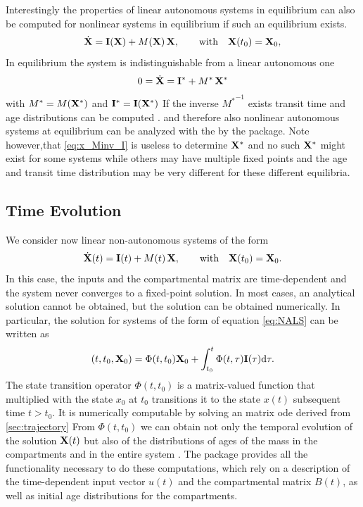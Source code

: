 Interestingly the properties of linear autonomous systems in equilibrium can
also be computed for nonlinear systems in equilibrium if such an equilibrium
exists.
\begin{equation} \label{eq:NLS}
\dot{\mathbf{X}} = \mathbf{I}(\mathbf{X}) + M(\mathbf{X}) \, \mathbf{X}, \qquad  \mathrm{with} \quad \mathbf{X}(t_0) = \mathbf{X}_0,
\end{equation}
In equilibrium the system is indistinguishable from a linear autonomous one
\begin{align} 
  0= \dot{\mathbf{X}} = \mathbf{I}^* + M^* \, \mathbf{X}^*
\end{align}
with $M^*=M(\mathbf{X}^*)$ and $\mathbf{I}^*=\mathbf{I}(\mathbf{X}^*)$ 
If the inverse ${M^*}^{-1}$ exists transit time and age distributions can be computed 
\citep{Metzler2018MGS}.
and therefore also  nonlinear autonomous
systems at equilibrium can be analyzed with the by the
\LAPM{} package.
Note however,that 
\eqref{eq:x_Minv_I} is useless to determine $\mathbf{X}^*$ and 
no such $\mathbf{X}^*$ might exist for some systems
while others may have multiple fixed points and the age and
transit time distribution may be very different for these different equilibria.

\subsection{Time Evolution} \label{sec:trajectory}
We consider now linear non-autonomous systems of the form
\begin{equation} \label{eq:NALS}
\dot{\mathbf{X}}(t) = \mathbf{I}(t) + M(t) \, \mathbf{X}, \qquad  \mathrm{with} \quad \mathbf{X}(t_0) = \mathbf{X}_0.
\end{equation}
In this case, the inputs and the compartmental matrix are time-dependent and
the system never converges to a fixed-point solution. In most cases, an
analytical solution cannot be obtained, but the solution can be 
obtained numerically. In particular, the solution for systems of the form of equation \eqref{eq:NALS} can be written as
\begin{equation}
(t, t_0, \mathbf{X}_0) = \Phi(t, t_0) \mathbf{X}_0 + \int_{t_0}^{t} \Phi(t, \tau) \mathbf{I}(\tau) \mathrm{d}\tau.
  \label{eqn:Phi}
\end{equation}
The state transition operator $\Phi(t,t_0)$ is a matrix-valued function that
multiplied with the state $x_0$ at $t_0$ transitions it to the state $x(t)$
subsequent time $t > t_0$. It is numerically computable by solving an matrix
ode derived from \eqref{sec:trajectory} 
From $\Phi(t,t_0)$ we can obtain not only the temporal evolution of the
solution $\mathbf{X}(t)$ but also of the distributions of ages of the mass in the compartments and in the entire system \citep{Metzler2018PNAS}.
The \CompartmentalSystems{} package provides all the functionality necessary to do these computations, which rely on a description of the time-dependent input vector $u(t)$ and the compartmental matrix $B(t)$, as well as initial age distributions for the compartments.

